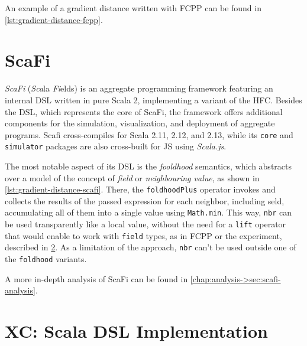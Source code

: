 An example of a gradient distance written with FCPP can be found in \cref{lst:gradient-distance-fcpp}.




\section{ScaFi} \label{chap:state-of-the-art->sec:scafi}

\textit{ScaFi} (\textit{Sca}la \textit{Fi}elds) is an aggregate programming framework featuring an internal \ac{DSL} written in pure Scala 2\cite{scafi}, implementing a variant of the \ac{HFC}.
%
Besides the \ac{DSL}, which represents the core of ScaFi, the framework offers additional components for the simulation, visualization, and deployment of aggregate programs.
%
Scafi cross-compiles for Scala 2.11, 2.12, and 2.13, while its \texttt{core} and \texttt{simulator} packages are also cross-built for \ac{JS} using \textit{Scala.js}\cite{scala-js}.

The most notable aspect of its \ac{DSL} is the \textit{fooldhood} semantics, which abstracts over a model of the concept of \textit{field} or \textit{neighbouring value}, as shown in \cref{lst:gradient-distance-scafi}.
%
There, the \texttt{foldhoodPlus} operator invokes and collects the results of the passed expression for each neighbor, including seld, accumulating all of them into a single value using \texttt{Math.min}.
%
This way, \texttt{nbr} can be used transparently like a local value, without the need for a \texttt{lift} operator that would enable to work with \texttt{field} types, as in FCPP or the  experiment, described in \cref{chap:state-of-the-art->sec:xc}.
%
As a limitation of the approach, \texttt{nbr} can't be used outside one of the \texttt{foldhood} variants.



A more in-depth analysis of ScaFi can be found in \cref{chap:analysis->sec:scafi-analysis}.

\section{XC: Scala DSL Implementation} \label{chap:state-of-the-art->sec:xc}


